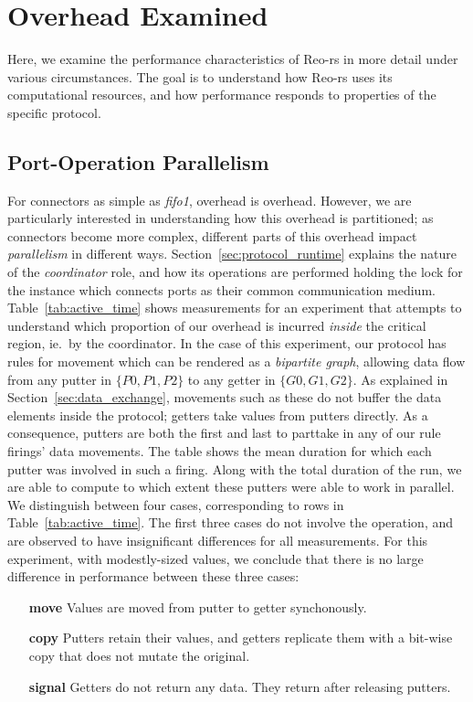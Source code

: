\section{Overhead Examined}
Here, we examine the performance characteristics of Reo-rs in more detail under various circumstances. The goal is to understand how Reo-rs uses its computational resources, and how performance responds to properties of the specific protocol.

\subsection{Port-Operation Parallelism}

For connectors as simple as \textit{fifo1}, overhead is overhead. However, we are particularly interested in understanding how this overhead is partitioned; as connectors become more complex, different parts of this overhead impact \textit{parallelism} in different ways. Section~\ref{sec:protocol_runtime} explains the nature of the \textit{coordinator} role, and how its operations are performed holding the lock for the  instance which connects ports as their common communication medium. Table~\ref{tab:active_time} shows measurements for an experiment that attempts to understand which proportion of our overhead is incurred \textit{inside} the critical region, ie.\ by the coordinator. In the case of this experiment, our protocol has rules for movement which can be rendered as a \textit{bipartite graph}, allowing data flow from any putter in $\{P0, P1, P2\}$ to any getter in $\{G0, G1, G2\}$. As explained in Section~\ref{sec:data_exchange}, movements such as these do not buffer the data elements inside the protocol; getters take values from putters directly. As a consequence, putters are both the first and last to parttake in any of our rule firings' data movements. The table shows the mean duration for which each putter was involved in such a firing. Along with the total duration of the run, we are able to compute to which extent these putters were able to work in parallel. We distinguish between four cases, corresponding to rows in Table~\ref{tab:active_time}. The first three cases do not involve the  operation, and are observed to have insignificant differences for all measurements. For this experiment, with modestly-sized values, we conclude that there is no large difference in performance between these three cases:
\begin{enumerate}
	\item [\textbf{move}] Values are moved from putter to getter synchonously.
	\item [\textbf{copy}] Putters retain their values, and getters replicate them with a bit-wise copy that does not mutate the original.
	\item [\textbf{signal}] Getters do not return any data. They return after releasing putters.
\end{enumerate}

